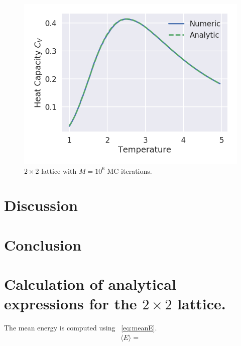 \documentclass[aps,reprint]{revtex4-1}
\newcommand\blankpage{%
  \null
  \thispagestyle{empty}%
  \addtocounter{page}{-1}%
  \newpage}
\newcommand{\mean}[1]{\langle #1 \rangle}
\begin{document}
\begin{figure}[H]
  \centering
  \includegraphics[width=\columnwidth]{figures/L2Ne6.png}
  \caption{$2 \times 2$ lattice with $M = 10^6$ MC iterations.}
  \label{fig:L2Ne6}
\end{figure}
\section{Discussion} \label{sec:discussion}

\section{Conclusion} \label{sec:conclusion}


\blankpage
\appendix
\section{Calculation of analytical expressions for the $2\times2$ lattice.} \label{sec:app}
The mean energy is computed using ~\ref{eq:meanE}.
\begin{align*}
  \mean{E} =
\end{align*}
\blankpage
\end{document}
